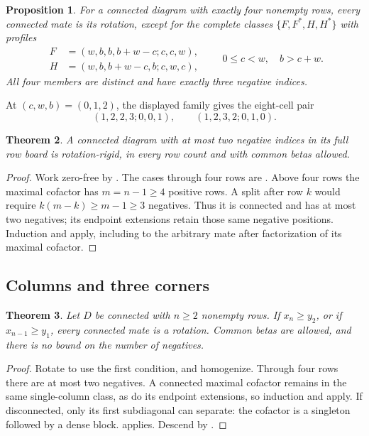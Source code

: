 \documentclass[11pt,a4paper]{amsart}
\numberwithin{equation}{section}
\theoremstyle{plain}
\newtheorem{theorem}{Theorem}[section]
\newtheorem{proposition}[theorem]{Proposition}
\theoremstyle{definition}
\begin{document}
\begin{proposition}\label{prop:four-rows}
For a connected diagram with exactly four nonempty rows, every connected
mate is its rotation, except for the complete classes
\(\{F,F^*,H,H^*\}\) with profiles
\begin{equation}\label{eq:four-family}
 \begin{aligned}
 F&=(w,b,b,b+w-c;c,c,w),\\
 H&=(w,b,b+w-c,b;c,w,c),
 \end{aligned}
 \qquad 0\le c<w,\quad b>c+w.
\end{equation}
All four members are distinct and have exactly three negative indices.
\end{proposition}

At \((c,w,b)=(0,1,2)\), the displayed family gives the eight-cell pair
\[
 (1,2,2,3;0,0,1),\qquad (1,2,3,2;0,1,0).
\]

\begin{theorem}\label{thm:two-negatives}
A connected diagram with at most two negative indices in its full row
board is rotation-rigid, in every row count and with common betas allowed.
\end{theorem}

\begin{proof}
Work zero-free by .  The cases through four rows
are .  Above four rows the maximal
cofactor has \(m=n-1\ge4\) positive rows.  A split after row \(k\) would
require \(k(m-k)\ge m-1\ge3\) negatives.  Thus it is connected and has
at most two negatives; its endpoint extensions retain those same negative
positions.  Induction and  apply, including to the
arbitrary mate after factorization of its maximal cofactor.
\end{proof}

\subsection{Columns and three corners}

\begin{theorem}\label{thm:column}
Let \(D\) be connected with \(n\ge2\) nonempty rows.  If
\(x_n\ge y_2\), or if \(x_{n-1}\ge y_1\), every connected mate is a
rotation.  Common betas are allowed, and there is no bound on the number
of negatives.
\end{theorem}

\begin{proof}
Rotate to use the first condition, and homogenize.  Through four rows
there are at most two negatives.  A connected maximal cofactor remains in
the same single-column class, as do its endpoint extensions, so induction
and  apply.  If disconnected, only its first subdiagonal
can separate: the cofactor is a singleton followed by a dense block.
 applies.  Descend by
.
\end{proof}
\end{document}
